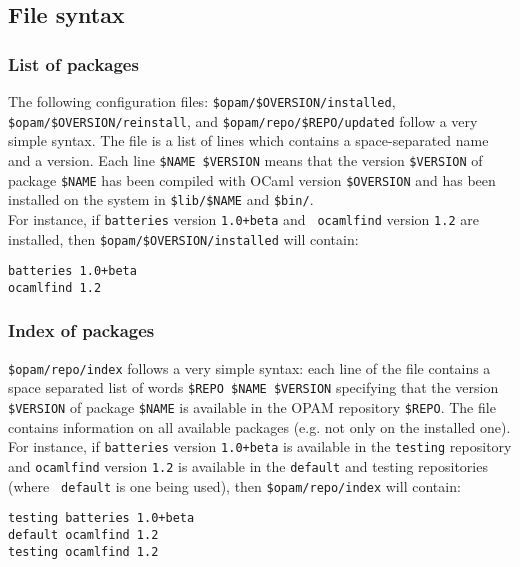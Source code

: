 \documentclass[a4paper,11pt]{article}
\begin{document}
\subsection{File syntax}

\subsubsection{List of packages}
\label{installed}

The following configuration files: \verb+$opam/$OVERSION/installed+,
\verb+$opam/$OVERSION/reinstall+, and \verb+$opam/repo/$REPO/updated+
follow a very simple syntax. The file is a list of lines which
contains a space-separated name and a version. Each line
\verb+$NAME $VERSION+ means that the version \verb+$VERSION+ of
package \verb+$NAME+ has been compiled with OCaml version
\verb+$OVERSION+ and has been installed on the system in
\verb+$lib/$NAME+ and \verb+$bin/+. \\

For instance, if {\tt batteries} version {\tt 1.0+beta} and {\tt
  ocamlfind} version {\tt 1.2} are installed, then
\verb+$opam/$OVERSION/installed+ will contain:

{\small
\begin{Verbatim}[frame=single]
batteries 1.0+beta
ocamlfind 1.2
\end{Verbatim}
}

\subsubsection{Index of packages}
\label{index}

\verb+$opam/repo/index+ follows a very simple syntax: each line of the
file contains a space separated list of words
\verb+$REPO $NAME $VERSION+ specifying that the version
\verb+$VERSION+ of package \verb+$NAME+ is available in the OPAM
repository \verb+$REPO+. The file contains information on all
available packages (e.g. not only on the installed one). \\

For instance, if {\tt batteries} version {\tt 1.0+beta} is available
in the {\tt testing} repository and {\tt ocamlfind} version {\tt 1.2}
is available in the {\tt default} and testing repositories (where {\tt
  default} is one being used), then \verb+$opam/repo/index+ will
contain:

{\small
\begin{Verbatim}[frame=single]
testing batteries 1.0+beta
default ocamlfind 1.2
testing ocamlfind 1.2
\end{Verbatim}
}
\end{document}
